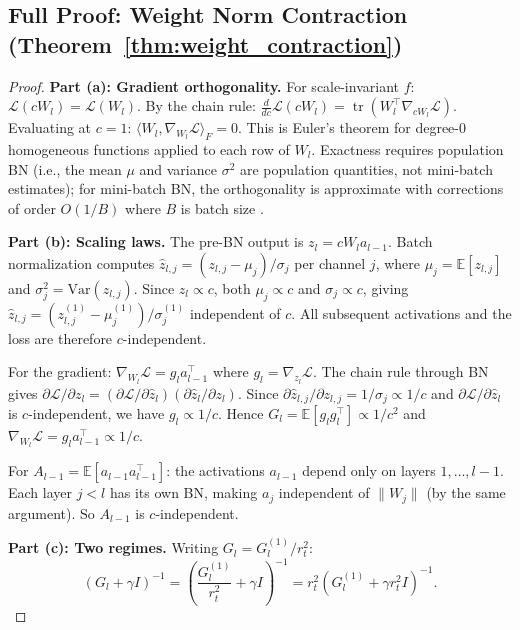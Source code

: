 \documentclass{article}
\providecommand{\E}{\mathbb{E}}
\providecommand{\norm}[1]{\lVert #1 \rVert}
\DeclareMathOperator{\tr}{tr}
\theoremstyle{plain}
\theoremstyle{definition}
\theoremstyle{remark}
\begin{document}
\subsection{Full Proof: Weight Norm Contraction (Theorem~\ref{thm:weight_contraction})}

\begin{proof}
\textbf{Part (a): Gradient orthogonality.} For scale-invariant $f$: $\mathcal{L}(cW_l) = \mathcal{L}(W_l)$. By the chain rule: $\frac{d}{dc}\mathcal{L}(cW_l) = \tr(W_l^\top\nabla_{cW_l}\mathcal{L})$. Evaluating at $c=1$: $\langle W_l, \nabla_{W_l}\mathcal{L}\rangle_F = 0$. This is Euler's theorem for degree-0 homogeneous functions applied to each row of $W_l$. Exactness requires population BN (i.e., the mean $\mu$ and variance $\sigma^2$ are population quantities, not mini-batch estimates); for mini-batch BN, the orthogonality is approximate with corrections of order $O(1/B)$ where $B$ is batch size \citep{kosson2024rotational}.

\textbf{Part (b): Scaling laws.} The pre-BN output is $z_l = cW_l a_{l-1}$. Batch normalization computes $\hat{z}_{l,j} = (z_{l,j} - \mu_j)/\sigma_j$ per channel $j$, where $\mu_j = \E[z_{l,j}]$ and $\sigma_j^2 = \mathrm{Var}(z_{l,j})$. Since $z_l \propto c$, both $\mu_j \propto c$ and $\sigma_j \propto c$, giving $\hat{z}_{l,j} = (z_{l,j}^{(1)} - \mu_j^{(1)})/\sigma_j^{(1)}$ independent of $c$. All subsequent activations and the loss are therefore $c$-independent.

For the gradient: $\nabla_{W_l}\mathcal{L} = g_l a_{l-1}^\top$ where $g_l = \nabla_{z_l}\mathcal{L}$. The chain rule through BN gives $\partial\mathcal{L}/\partial z_l = (\partial\mathcal{L}/\partial\hat{z}_l)(\partial\hat{z}_l/\partial z_l)$. Since $\partial\hat{z}_{l,j}/\partial z_{l,j} = 1/\sigma_j \propto 1/c$ and $\partial\mathcal{L}/\partial\hat{z}_l$ is $c$-independent, we have $g_l \propto 1/c$. Hence $G_l = \E[g_l g_l^\top] \propto 1/c^2$ and $\nabla_{W_l}\mathcal{L} = g_l a_{l-1}^\top \propto 1/c$.

For $A_{l-1} = \E[a_{l-1}a_{l-1}^\top]$: the activations $a_{l-1}$ depend only on layers $1, \ldots, l{-}1$. Each layer $j < l$ has its own BN, making $a_j$ independent of $\norm{W_j}$ (by the same argument). So $A_{l-1}$ is $c$-independent.

\textbf{Part (c): Two regimes.} Writing $G_l = G_l^{(1)}/r_t^2$:
\begin{equation}
    (G_l + \gamma I)^{-1} = \left(\frac{G_l^{(1)}}{r_t^2} + \gamma I\right)^{-1} = r_t^2\left(G_l^{(1)} + \gamma r_t^2 I\right)^{-1}.
\end{equation}


\end{proof}
\end{document}
